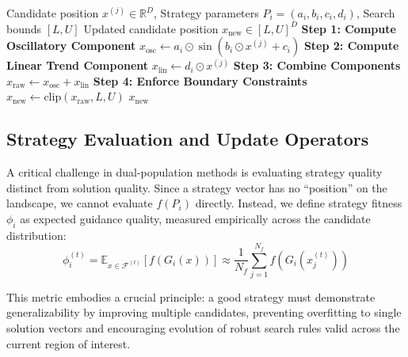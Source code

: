 \documentclass[11pt]{article}
\begin{document}
\begin{algorithm}[h]
\caption{Strategy Vector Guidance Application}
\label{alg:guidance}
\begin{algorithmic}[1]
\Require Candidate position $x^{(j)} \in \mathbb{R}^D$, Strategy parameters $P_i = (a_i, b_i, c_i, d_i)$, Search bounds $[L, U]$
\Ensure Updated candidate position $x_{\text{new}} \in [L, U]^D$
\State \textbf{Step 1: Compute Oscillatory Component}
\State $x_{\text{osc}} \leftarrow a_i \odot \sin(b_i \odot x^{(j)} + c_i)$ 
\State \textbf{Step 2: Compute Linear Trend Component}
\State $x_{\text{lin}} \leftarrow d_i \odot x^{(j)}$ 
\State \textbf{Step 3: Combine Components}
\State $x_{\text{raw}} \leftarrow x_{\text{osc}} + x_{\text{lin}}$ 
\State \textbf{Step 4: Enforce Boundary Constraints}
\State $x_{\text{new}} \leftarrow \text{clip}(x_{\text{raw}}, L, U)$ 
\State \Return $x_{\text{new}}$
\end{algorithmic}
\end{algorithm}

\subsection{Strategy Evaluation and Update Operators}


A critical challenge in dual-population methods is evaluating strategy quality distinct from solution quality. Since a strategy vector has no ``position'' on the landscape, we cannot evaluate $f(P_i)$ directly. Instead, we define strategy fitness $\phi_i$ as expected guidance quality, measured empirically across the candidate distribution:
\begin{equation}
\phi_i^{(t)} = \mathbb{E}_{x \in \mathcal{F}^{(t)}}[f(G_i(x))] \approx \frac{1}{N_f} \sum_{j=1}^{N_f} f(G_i(x_j^{(t)}))
\label{eq:strategy_fitness}
\end{equation}

This metric embodies a crucial principle: a good strategy must demonstrate generalizability by improving multiple candidates, preventing overfitting to single solution vectors and encouraging evolution of robust search rules valid across the current region of interest.
\end{document}
